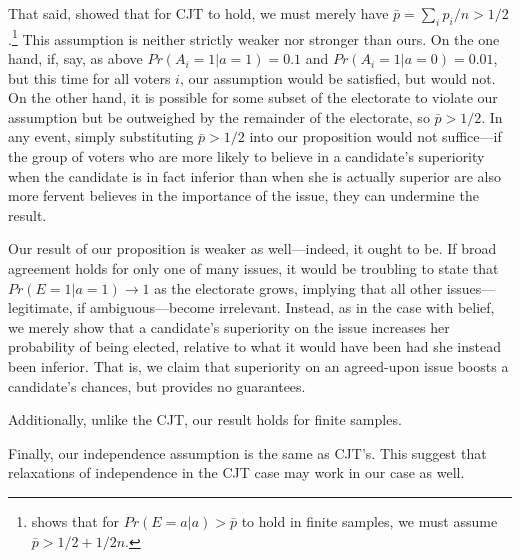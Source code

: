 \documentclass[11pt]{article}
\begin{document}
That said, \citet{dietrich2008premises} showed that for CJT to
hold, we must merely have $\bar{p}=\sum_i
p_i/n>1/2$.\footnote{\citet{boland1989majority} shows that for
  $Pr(E=a|a)>\bar{p}$ to hold in finite samples, we must assume $\bar{p}>1/2 +1/2n$.}
This assumption is neither strictly weaker nor stronger than ours.
On the one hand, if, say, as above 
$Pr(A_i=1|a=1)=0.1$ and $Pr(A_i=1|a=0)=0.01$, but this time for all
voters $i$, our assumption would be satisfied, but
\citet{dietrich2008premises} would not.
On the other hand, it is possible for some subset of the electorate to
violate our assumption but be outweighed by the remainder of the
electorate, so $\bar{p}>1/2$.
In any event, simply substituting $\bar{p}>1/2$ into our proposition
would not suffice---if the group of voters who are more likely to
believe in a candidate's superiority when the candidate is in fact
inferior than when she is actually superior are also more fervent
believes in the importance of the issue, they can undermine the
result. 

Our result of our proposition is weaker as well---indeed, it ought to be. 
If broad agreement holds for only one of many issues, it would be
troubling to state that $Pr(E=1|a=1)\rightarrow 1$ as the electorate
grows, implying that all other issues---legitimate, if
ambiguous---become irrelevant. 
Instead, as in the case with belief, we merely show that a candidate's
superiority on the issue increases her probability of being elected,
relative to what it would have been had she instead been inferior. 
That is, we claim that superiority on an agreed-upon issue boosts a
candidate's chances, but provides no guarantees. 

Additionally, unlike the CJT, our result holds for finite samples.

Finally, our independence assumption is the same as CJT's. 
This suggest that relaxations of independence in the CJT case
\citep[e.g.]{boland1989modelling} may work in our case as well. 
\end{document}
